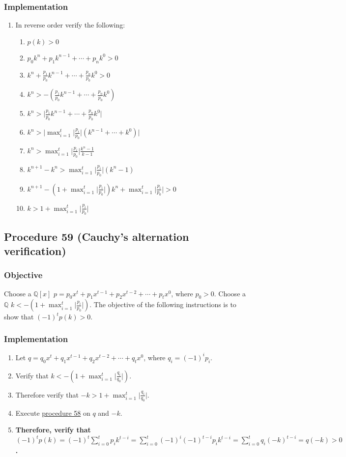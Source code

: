 \documentclass[twocolumn]{article}
\begin{document}
			\subsubsection{Implementation}
				\begin{enumerate}
					\item In reverse order verify the following:
					\begin{enumerate}
						\item \textbf{$p(k)>0$}
						\item $p_0k^n+p_1k^{n-1}+\cdots+p_nk^0>0$
						\item $k^n+\frac{p_1}{p_0}k^{n-1}+\cdots+\frac{p_n}{p_0}k^0>0$
						\item $k^n>-(\frac{p_1}{p_0}k^{n-1}+\cdots+\frac{p_n}{p_0}k^0)$
						\item $k^n>\lvert \frac{p_1}{p_0}k^{n-1}+\cdots+\frac{p_n}{p_0}k^0\rvert$
						\item $k^n>\lvert\max_{i=1}^t\lvert \frac{p_i}{p_0}\rvert(k^{n-1}+\cdots+k^0)\rvert$
						\item $k^n>\max_{i=1}^t\lvert \frac{p_i}{p_0}\rvert\frac{k^n-1}{k-1}$
						\item $k^{n+1}-k^n>\max_{i=1}^t\lvert \frac{p_i}{p_0}\rvert(k^n-1)$
						\item $k^{n+1}-(1+\max_{i=1}^t\lvert \frac{p_i}{p_0}\rvert)k^n+\max_{i=1}^t\lvert \frac{p_i}{p_0}\rvert>0$
						\item $k>1+\max_{i=1}^t\lvert \frac{p_i}{p_0}\rvert$
					\end{enumerate}
				\end{enumerate}
		\subsection{Procedure 59 (Cauchy's alternation verification)}\label{sec:procedure 59}
			\subsubsection{Objective}
				Choose a $\mathbb{Q}[x]$ $p=p_0x^t+p_1x^{t-1}+p_2x^{t-2}+\cdots+p_tx^0$, where $p_0>0$. Choose a $\mathbb{Q}$ $k<-(1+\max_{i=1}^t\lvert\frac{p_i}{p_0}\rvert)$. The objective of the following instructions is to show that $(-1)^tp(k)>0$.
			\subsubsection{Implementation}
				\begin{enumerate}
					\item Let $q=q_0x^t+q_1x^{t-1}+q_2x^{t-2}+\cdots+q_tx^0$, where $q_i=(-1)^ip_i$.
					\item Verify that $k<-(1+\max_{i=1}^t\lvert\frac{q_i}{q_0}\rvert)$.
					\item Therefore verify that $-k>1+\max_{i=1}^t\lvert\frac{q_i}{q_0}\rvert$.
					\item Execute \hyperref[sec:procedure 58]{procedure 58} on $q$ and $-k$.
					\item \textbf{Therefore, verify that $(-1)^tp(k)=(-1)^t\sum_{i=0}^t p_ik^{t-i}=\sum_{i=0}^t (-1)^i(-1)^{t-i}p_ik^{t-i}=\sum_{i=0}^t q_i(-k)^{t-i}=q(-k)>0$.}
				\end{enumerate}
\end{document}
